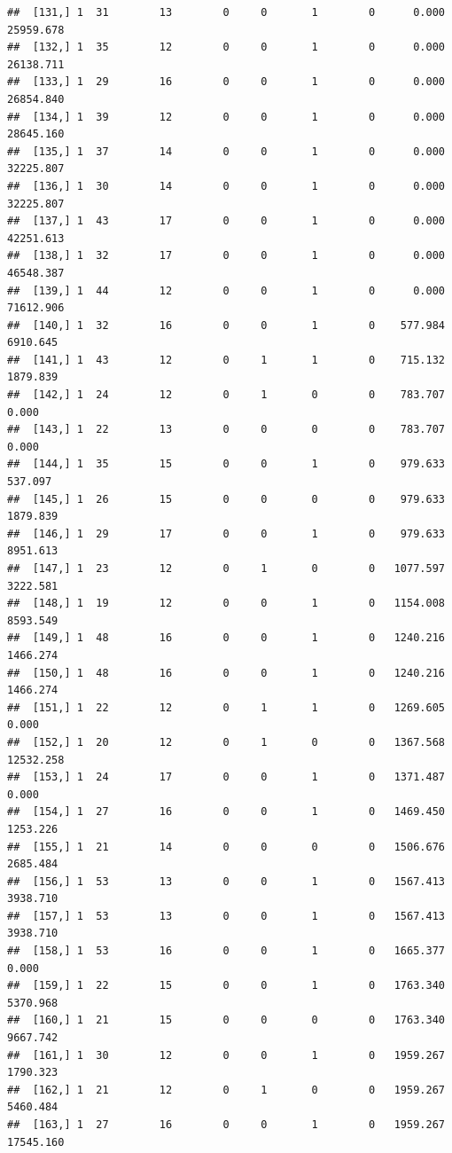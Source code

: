 \documentclass[
]{article}
\begin{document}
\begin{verbatim}
##  [131,] 1  31        13        0     0       1        0      0.000  25959.678
##  [132,] 1  35        12        0     0       1        0      0.000  26138.711
##  [133,] 1  29        16        0     0       1        0      0.000  26854.840
##  [134,] 1  39        12        0     0       1        0      0.000  28645.160
##  [135,] 1  37        14        0     0       1        0      0.000  32225.807
##  [136,] 1  30        14        0     0       1        0      0.000  32225.807
##  [137,] 1  43        17        0     0       1        0      0.000  42251.613
##  [138,] 1  32        17        0     0       1        0      0.000  46548.387
##  [139,] 1  44        12        0     0       1        0      0.000  71612.906
##  [140,] 1  32        16        0     0       1        0    577.984   6910.645
##  [141,] 1  43        12        0     1       1        0    715.132   1879.839
##  [142,] 1  24        12        0     1       0        0    783.707      0.000
##  [143,] 1  22        13        0     0       0        0    783.707      0.000
##  [144,] 1  35        15        0     0       1        0    979.633    537.097
##  [145,] 1  26        15        0     0       0        0    979.633   1879.839
##  [146,] 1  29        17        0     0       1        0    979.633   8951.613
##  [147,] 1  23        12        0     1       0        0   1077.597   3222.581
##  [148,] 1  19        12        0     0       1        0   1154.008   8593.549
##  [149,] 1  48        16        0     0       1        0   1240.216   1466.274
##  [150,] 1  48        16        0     0       1        0   1240.216   1466.274
##  [151,] 1  22        12        0     1       1        0   1269.605      0.000
##  [152,] 1  20        12        0     1       0        0   1367.568  12532.258
##  [153,] 1  24        17        0     0       1        0   1371.487      0.000
##  [154,] 1  27        16        0     0       1        0   1469.450   1253.226
##  [155,] 1  21        14        0     0       0        0   1506.676   2685.484
##  [156,] 1  53        13        0     0       1        0   1567.413   3938.710
##  [157,] 1  53        13        0     0       1        0   1567.413   3938.710
##  [158,] 1  53        16        0     0       1        0   1665.377      0.000
##  [159,] 1  22        15        0     0       1        0   1763.340   5370.968
##  [160,] 1  21        15        0     0       0        0   1763.340   9667.742
##  [161,] 1  30        12        0     0       1        0   1959.267   1790.323
##  [162,] 1  21        12        0     1       0        0   1959.267   5460.484
##  [163,] 1  27        16        0     0       1        0   1959.267  17545.160

\end{verbatim}
\end{document}
